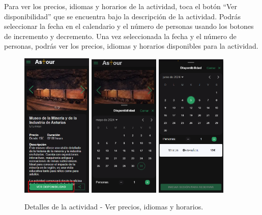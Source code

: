 Para ver los precios, idiomas y horarios de la actividad, toca el botón “Ver disponibilidad” que se encuentra bajo la descripción de la actividad.
Podrás seleccionar la fecha en el calendario y el número de personas usando los botones de incremento y decremento.
Una vez seleccionada la fecha y el número de personas, podrás ver los precios, idiomas y horarios disponibles para la actividad.
\begin{figure}[H]
	\centering
	\includegraphics[width=0.3\textwidth]{7-Construccion/Manuales/mobile/ver disponibilidad.png}
	\includegraphics[width=0.3\textwidth]{7-Construccion/Manuales/mobile/disponibilidad.png}
	\includegraphics[width=0.3\textwidth]{7-Construccion/Manuales/mobile/fecha seleccionada.png}
	\caption{Detalles de la actividad - Ver precios, idiomas y horarios.}
\end{figure}

